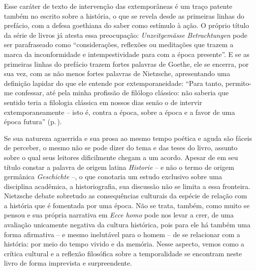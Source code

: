 Esse caráter de texto de intervenção das extemporâneas é um traço
patente também no escrito sobre a história, o que se revela desde as
primeiras linhas do prefácio, com a defesa goethiana do saber como
estímulo à ação. O próprio título da série de livros já atesta essa
preocupação: \emph{Unzeitgemässe Betrachtungen} pode ser parafraseado
como ``considerações, reflexões ou meditações que trazem a marca da
inconformidade e intempestividade para com a época presente''. E se as
primeiras linhas do prefácio trazem fortes palavras de Goethe, ele se
encerra, por sua vez, com as não menos fortes palavras de Nietz\-sche,
apresentando uma definição lapidar do que ele entende por
extemporaneidade: ``Para tanto, permito-me confessar, até pela minha
profissão de filólogo clássico: não saberia que sentido teria a
filologia clássica em nossos dias senão o de intervir extemporaneamente
-- isto é, contra a época, sobre a época e a favor de uma época
futura'' (p.\,\pageref{epocafutura}).

Se sua natureza aguerrida e sua prosa ao mesmo tempo poética e aguda são
fáceis de perceber, o mesmo não se pode dizer do tema e das teses do
livro, assunto sobre o qual seus leitores dificilmente chegam a um
acordo. Apesar de em seu título constar a palavra de origem latina
\emph{Historie} -- e não o termo de origem germânica \emph{Geschichte}
--, o que conotaria um estudo exclusivo sobre uma disciplina acadêmica,
a historiografia, sua discussão não se limita a essa fronteira.
Nietz\-sche debate sobretudo as consequências culturais da espécie de
relação com a história que é fomentada por uma época. Não se trata,
também, como muito se pensou e sua própria narrativa em \emph{Ecce homo}
pode nos levar a crer, de uma avaliação unicamente negativa da cultura
histórica, pois para ele há também uma forma afirmativa -- e mesmo
inelutável para o homem -- de se relacionar com a história: por meio do
tempo vivido e da memória. Nesse aspecto, vemos como a crítica cultural
e a reflexão filosófica sobre a temporalidade se encontram neste livro
de forma imprevista e surpreendente.

